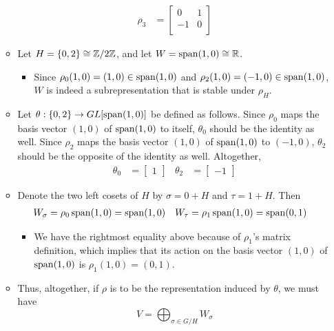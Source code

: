\documentclass[../notes.tex]{subfiles}
\begin{document}
\begin{itemize}
\begin{itemize}
\begin{align*}
            \rho_3 &=
            \begin{bmatrix}
                0 & 1\\
                -1 & 0\\
            \end{bmatrix}
        \end{align*}
        \item Let $H=\{0,2\}\cong\mathbb{Z}/2\mathbb{Z}$, and let $W=\operatorname{span}(1,0)\cong\mathbb{R}$.
        \begin{itemize}
            \item Since $\rho_0(1,0)=(1,0)\in\operatorname{span}(1,0)$ and $\rho_2(1,0)=(-1,0)\in\operatorname{span}(1,0)$, $W$ is indeed a subrepresentation that is stable under $\rho_H$.
        \end{itemize}
        \item Let $\theta:\{0,2\}\to GL[\operatorname{span}(1,0)]$ be defined as follows. Since $\rho_0$ maps the basis vector $(1,0)$ of $\operatorname{span}(1,0)$ to itself, $\theta_0$ should be the identity as well. Since $\rho_2$ maps the basis vector $(1,0)$ of $\operatorname{span}(1,0)$ to $(-1,0)$, $\theta_2$ should be the opposite of the identity as well. Altogether,
        \begin{align*}
            \theta_0 &=
            \begin{bmatrix}
                1
            \end{bmatrix}&
            \theta_2 &=
            \begin{bmatrix}
                -1
            \end{bmatrix}
        \end{align*}
        \item Denote the two left cosets of $H$ by $\sigma=0+H$ and $\tau=1+H$. Then 
        \begin{align*}
            W_\sigma &= \rho_0\operatorname{span}(1,0) = \operatorname{span}(1,0)&
            W_\tau   &= \rho_1\operatorname{span}(1,0) = \operatorname{span}(0,1)
        \end{align*}
        \begin{itemize}
            \item We have the rightmost equality above because of $\rho_1$'s matrix definition, which implies that its action on the basis vector $(1,0)$ of $\operatorname{span}(1,0)$ is $\rho_1(1,0)=(0,1)$.
        \end{itemize}
        \item Thus, altogether, if $\rho$ is to be the representation induced by $\theta$, we must have
        \begin{equation*}
            V = \bigoplus_{\sigma\in G/H}W_\sigma

\end{equation*}
\end{itemize}
\end{itemize}
\end{document}
